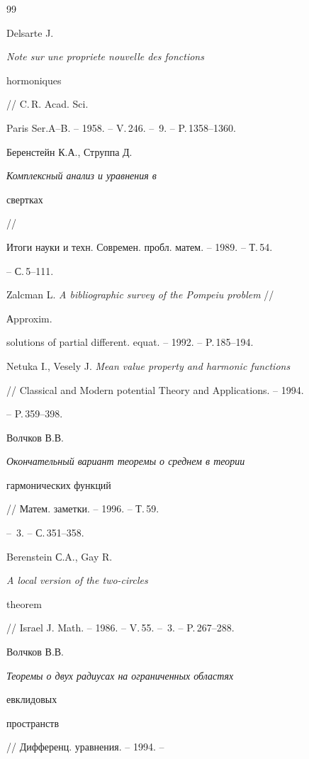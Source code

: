 \begin{thebibliography}{99} 


 




Delsarte J. {\em Note sur une propriete nouvelle des fonctions 


hormoniques} 


// C.\,R. Acad. Sci. 


Paris Ser.A--B. -- 1958. -- V.\,246. -- \No\,9. -- P.\,1358--1360. 




Беренстейн К.А., Струппа Д. {\em Комплексный анализ и уравнения в 


свертках} // 


Итоги науки и техн. Современ. пробл. матем. -- 1989. -- Т.\,54. 


-- С.\,5--111. 




Zalcman L. {\em A bibliographic survey of the Pompeiu problem} // 


Аpproxim. 


solutions of partial different. equat. -- 1992. -- P.\,185--194. 




Netuka I., Vesely J. {\em Mean value property and harmonic functions} 


// Classical and Modern potential Theory and Applications. -- 1994. 


-- P.\,359--398. 




Волчков В.В. {\em Окончательный вариант теоремы о среднем в теории 


гармонических функций} // Матем. заметки. -- 1996. -- Т.\,59. 


-- \No\,3. -- С.\,351--358. 




Berenstein С.A., Gay R. {\em A local version of the two-circles 


theorem} 


// Israel J. Math. -- 1986. -- V.\,55. -- \No\,3. -- P.\,267--288. 




Волчков В.В. {\em Теоремы о двух радиусах на ограниченных областях 


евклидовых 


пространств} // Дифференц. уравнения. -- 1994. -- 



\end{thebibliography}
